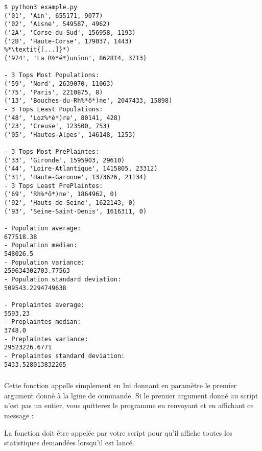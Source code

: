 \begin{lstlisting}[frame=single]
$ python3 example.py
('01', 'Ain', 655171, 9077)
('02', 'Aisne', 549587, 4962)
('2A', 'Corse-du-Sud', 156958, 1193)
('2B', 'Haute-Corse', 179037, 1443)
%*\textit{[...]}*)
('974', 'La R%*é*)union', 862814, 3713)

- 3 Tops Most Populations:
('59', 'Nord', 2639070, 11063)
('75', 'Paris', 2210875, 8)
('13', 'Bouches-du-Rh%*ô*)ne', 2047433, 15898)
- 3 Tops Least Populations:
('48', 'Loz%*è*)re', 80141, 428)
('23', 'Creuse', 123500, 753)
('05', 'Hautes-Alpes', 146148, 1253)

- 3 Tops Most PrePlaintes:
('33', 'Gironde', 1595903, 29610)
('44', 'Loire-Atlantique', 1415805, 23312)
('31', 'Haute-Garonne', 1373626, 21134)
- 3 Tops Least PrePlaintes:
('69', 'Rh%*ô*)ne', 1864962, 0)
('92', 'Hauts-de-Seine', 1622143, 0)
('93', 'Seine-Saint-Denis', 1616311, 0)

- Population average:
677518.38
- Population median:
548026.5
- Population variance:
259634302703.77563
- Population standard deviation:
509543.2294749638

- Preplaintes average:
5593.23
- Preplaintes median:
3748.0
- Preplaintes variance:
29523226.6771
- Preplaintes standard deviation:
5433.528013832265
\end{lstlisting}


\bigskip


\subsubsection*{}

\noindent Cette fonction appelle simplement  en lui donnant en paramètre le premier argument donné à la lgine de commande.
Si le premier argument donné au script n'est pas un entier, vous quitterez le programme en renvoyant  et en affichant ce message :

\medskip


\medskip

\noindent La fonction  doit être appelée par votre script pour qu'il affiche toutes les statistiques demandées lorsqu'il est lancé.

